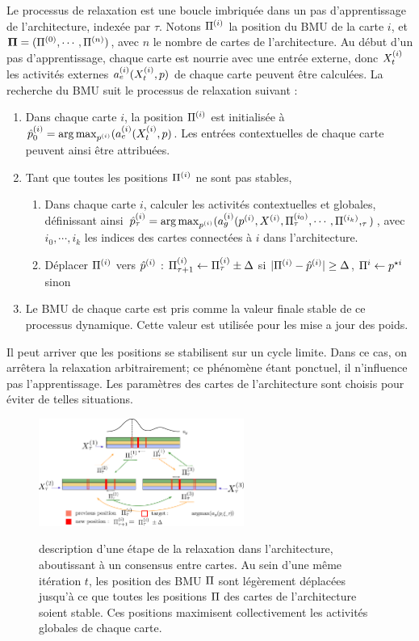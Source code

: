 Le processus de relaxation est une boucle imbriquée dans un pas d'apprentissage de l'architecture, indexée par $\tau$. Notons $\Pi^{({i})}$ la position du BMU de la carte $i$, et $\mathbf{\Pi} = (\Pi^{({0})}, \cdots , \Pi^{({n})})$, avec $n$ le nombre de cartes de l'architecture.
Au début d'un pas d'apprentissage, chaque carte est nourrie avec une entrée externe, donc $X^{({i})}_t$ les activités externes $a_e^{({i})}(X^{({i})}_t,p)$ de chaque carte peuvent être calculées.
La recherche du BMU suit le processus de relaxation suivant :
\begin{enumerate}
\item Dans chaque carte $i$, la position $\Pi^{({i})}$ est initialisée à $\hat{p}^{({i})}_0 = \operatorname*{arg\,max}_{p^{({i})}}(a_e^{({i})}(X^{({i})}_t,p)$. Les entrées contextuelles de chaque carte peuvent ainsi être attribuées.
\item Tant que toutes les positions $\Pi^{({i})}$ ne sont pas stables, 
	\begin{enumerate}
	\item Dans chaque carte $i$, calculer les activités contextuelles et globales, définissant ainsi $\hat{p}^{({i})}_\tau = \operatorname*{arg\,max}_{p^{({i})}}(a_g^{({i})}(p^{({i})},X^{({i})}, \Pi^{({i_0})}_\tau,\cdots,\Pi^{({i_k})},_\tau)$, avec $i_0, \cdots, i_k$ les indices des cartes connectées à $i$ dans l'architecture.
	\item Déplacer $\Pi^{({i})}$ vers $\hat{p}^{({i})}$ : $\Pi^{({i})}_{\tau +1} \leftarrow \Pi^{({i})}_\tau \pm \Delta$ si $\lvert \Pi^{({i})}- \hat{p}^{({i})}\rvert \geq \Delta$, $\Pi^i \leftarrow p^{\star i}$ sinon
	\end{enumerate}
\item Le BMU de chaque carte est pris comme la valeur finale stable de ce processus dynamique. Cette valeur est utilisée pour les mise a jour des poids.
\end{enumerate}

Il peut arriver que les positions se stabilisent sur un cycle limite. Dans ce cas, on arrêtera la relaxation arbitrairement; ce phénomène étant ponctuel, il n'influence pas l'apprentissage. Les paramètres des cartes de l'architecture sont choisis pour éviter de telles situations.

\begin{figure}
\centering
\includegraphics[width=0.6\textwidth]{relaxation.pdf}
\label{fig:relax}
\caption{description d'une étape de la relaxation dans l'architecture, aboutissant à un consensus entre cartes. Au sein d'une même itération $t$, les position des BMU $\Pi$ sont légèrement déplacées jusqu'à ce que toutes les positions $\Pi$ des cartes de l'architecture soient stable. Ces positions maximisent collectivement les activités globales de chaque carte. }
\end{figure}

